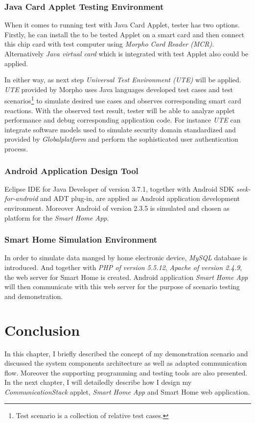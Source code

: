 \subsubsection{Java Card Applet Testing Environment}
When it comes to running test with Java Card Applet, tester has two options. Firstly, he can install the to be tested Applet on a smart card and then connect this chip card with test computer using \emph{Morpho Card Reader (MCR)}. Alternatively \emph{Java virtual card} which is integrated with test Applet also could be applied. 

In either way, as next step \emph{Universal Test Environment (UTE)} will be applied. \emph{UTE} provided by Morpho uses Java languages developed test cases
 and test scenarios\footnote{Test scenario is a collection of relative test cases.} to simulate desired use cases and observes corresponding smart card reactions. With the observed test result, tester will be able to analyze applet performance and debug corresponding application code. For instance \emph{UTE} can integrate software models used to simulate security domain standardized and provided by \emph{Globalplatform} and perform the sophisticated user authentication process.
\subsubsection{Android Application Design Tool}
Eclipse IDE for Java Developer of version 3.7.1, together with Android SDK \emph{seek-for-android} and ADT plug-in, are applied as Android application development environment. Moreover Android of version 2.3.5 is simulated and chosen as platform for the \emph{Smart Home App}.
\subsubsection{Smart Home Simulation Environment}
In order to simulate data manged by home electronic device, \emph{MySQL} database is introduced. And together with \emph{PHP of version 5.5.12}, \emph{Apache of version 2.4.9}, the web server for Smart Home is created. Android application \emph{Smart Home App} will then communicate with this web server for the purpose of scenario testing and demonstration.

\section{Conclusion}
In this chapter, I briefly described the concept of my demonstration scenario and discussed the system components architecture as well as adapted communication flow. Moreover the supporting programming and testing tools are also presented. In the next chapter, I will detailedly describe how I design my \emph{CommunicationStack} applet, \emph{Smart Home App} and Smart Home web application.